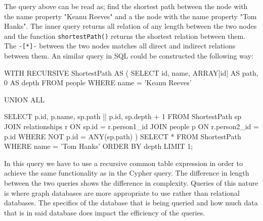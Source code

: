 The query above can be read as; find the shortest path between the node with the name property "Keanu Reeves" and a the node with the name property "Tom Hanks". The inner query returns all relation of any length between the two nodes and the function \texttt{shortestPath()} returns the shortest relation between them. The \texttt{-[*]-} between the two nodes matches all direct and indirect relations between them. An similar query in SQL could be constructed the following way:
\begin{sqlCode}
WITH RECURSIVE ShortestPath AS (
SELECT
  id,
  name,
  ARRAY[id] AS path,
  0 AS depth
FROM
  people
WHERE
  name = 'Keanu Reeves'

UNION ALL

SELECT
  p.id,
  p.name,
  sp.path || p.id,
  sp.depth + 1
FROM
  ShortestPath sp
JOIN
  relationships r ON sp.id = r.person1_id
JOIN
  people p ON r.person2_id = p.id
WHERE
  NOT p.id = ANY(sp.path)
  )
SELECT *
FROM ShortestPath
WHERE name = 'Tom Hanks'
ORDER BY depth
LIMIT 1;

\end{sqlCode}
In this query we have to use a recursive common table expression in order to achieve the same functionality as in the Cypher query. The difference in length between the two queries shows the difference in complexity. Queries of this nature is where graph databases are more appropriate to use rather than relational databases. The specifics of the database that is being queried and how much data that is in said database does impact the efficiency of the queries.



